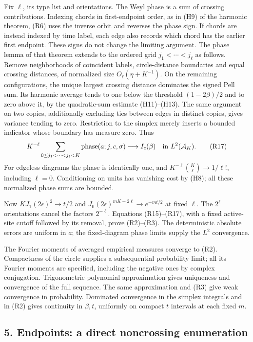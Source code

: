 Fix \(\ell\), its type list and orientations. The Weyl phase is a sum of
crossing contributions. Indexing chords in first-endpoint order, as in
(H9) of the harmonic theorem, (R6) uses the inverse orbit and reverses
the phase sign. If chords are instead indexed by time label, each edge
also records which chord has the earlier first endpoint. These signs
do not change the limiting argument. The phase lemma of that theorem
extends to the ordered grid \(j_1<\cdots<j_\ell\) as follows. Remove
neighborhoods of coincident labels, circle-distance boundaries and
equal crossing distances, of normalized size \(O_\ell(\eta+K^{-1})\).
On the remaining configurations, the unique largest crossing distance
dominates the signed Pell sum. Its harmonic average tends to one below
the threshold \((1-2\beta)/2\) and to zero above it, by the quadratic-sum
estimate (H11)--(H13). The same argument on two copies, additionally
excluding ties between edges in distinct copies, gives variance tending
to zero. Restriction to the simplex merely inserts a bounded indicator
whose boundary has measure zero. Thus
\[
 K^{-\ell}\sum_{0\le j_1<\cdots<j_\ell<K}
       \text{phase}(a;j,c,\sigma)
       \longrightarrow I_c(\beta)\quad\hbox{in }L^2(\mathcal A_K).
                                                               \tag{R17}
\]
For edgeless diagrams the phase is identically one, and
\(K^{-\ell}\binom K\ell\to1/\ell!\), including \(\ell=0\).
Conditioning on units has vanishing
cost by (H8); all these normalized phase sums are bounded.

Now \(KJ_1(2\epsilon)^2\to t/2\) and
\(J_0(2\epsilon)^{mK-2\ell}\to e^{-mt/2}\) at fixed \(\ell\).
The \(2^\ell\) orientations cancel the factors \(2^{-\ell}\).
Equations (R15)--(R17), with a fixed active-site cutoff followed by
its removal, prove (R2)--(R3). The deterministic absolute errors are
uniform in \(a\); the fixed-diagram phase limits supply the \(L^2\) convergence.

The Fourier moments of averaged empirical measures converge to (R2).
Compactness of the circle supplies a subsequential probability limit;
all its Fourier moments are specified, including the negative ones by
complex conjugation. Trigonometric-polynomial approximation gives
uniqueness and convergence of the full sequence. The same approximation
and (R3) give weak convergence in probability. Dominated convergence in
the simplex integrals and in (R2) gives continuity in \(\beta,t\), uniformly
on compact \(t\) intervals at each fixed \(m\).

\hypertarget{harmonic-returns-endpoints-a-direct-noncrossing-enumeration}{%
\subsection{5. Endpoints: a direct noncrossing enumeration}\label{harmonic-returns-endpoints-a-direct-noncrossing-enumeration}}

